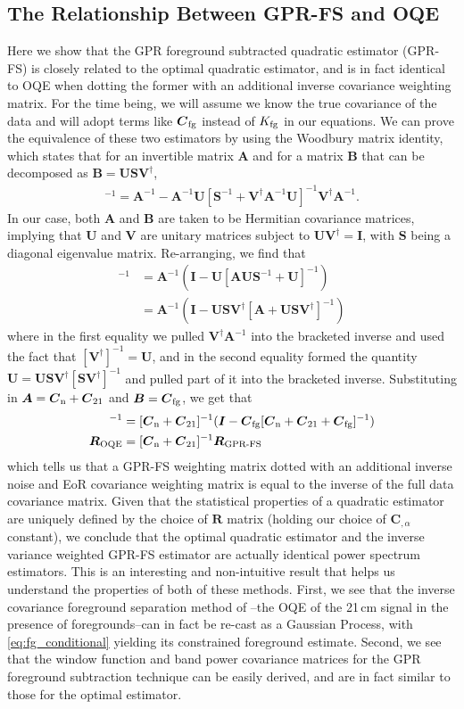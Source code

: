 \documentclass[a4paper,fleqn,usenatbib]{mnras}
\def\R{\boldsymbol{R}}
\def\C{\boldsymbol{C}}
\def\V{\boldsymbol{V}}
\def\Cfg{\boldsymbol{C}_{\rm fg}}
\def\Cto{\boldsymbol{C}_{\rm 21}}
\def\Cn{\boldsymbol{C}_{\rm n}}
\def\I{\boldsymbol{I}}
\def\Kfg{K_{\rm fg}}
\def\A{\boldsymbol{A}}
\def\B{\boldsymbol{B}}
\def\U{\boldsymbol{U}}
\def\S{\boldsymbol{S}}
\def\V{\boldsymbol{V}}
\begin{document}
\subsection{The Relationship Between GPR-FS and OQE}
\label{sec:gpr_oqe}

Here we show that the GPR foreground subtracted quadratic estimator (GPR-FS) is closely related to the optimal quadratic estimator, and is in fact identical to OQE when dotting the former with an additional inverse covariance weighting matrix.
For the time being, we will assume we know the true covariance of the data and will adopt terms like $\Cfg$ instead of $\Kfg$ in our equations.
We can prove the equivalence of these two estimators by using the Woodbury matrix identity, which states that for an invertible matrix $\A$ and for a matrix $\B$ that can be decomposed as $\B = \U\S\V^\dagger$,
\begin{align}
[\A + \U\S\V^\dagger]^{-1} = \A^{-1} - \A^{-1}\U[\S^{-1} + \V^\dagger\A^{-1}\U]^{-1}\V^\dagger\A^{-1}.
\end{align}
In our case, both $\A$ and $\B$ are taken to be Hermitian covariance matrices, implying that $\U$ and $\V$ are unitary matrices subject to $\U\V^\dagger = \I$, with $\S$ being a diagonal eigenvalue matrix.
Re-arranging, we find that
\begin{align}
[\A + \U\S\V^\dagger]^{-1} &= \A^{-1}(\I - \U[\A\U\S^{-1} + \U]^{-1}) \nonumber \\ 
&=\A^{-1}(\I - \U\S\V^\dagger[\A + \U\S\V^\dagger]^{-1})
\end{align}
where in the first equality we pulled $\V^\dagger\A^{-1}$ into the bracketed inverse and used the fact that $[\V^\dagger]^{-1} = \U$, and in the second equality formed the quantity $\U = \U\S\V^\dagger[\S\V^\dagger]^{-1}$ and pulled part of it into the bracketed inverse.
Substituting in $\A = \Cn + \Cto$ and $\B = \Cfg$, we get that
\begin{align}
[\Cn + \Cto + \Cfg]^{-1} &= [\Cn + \Cto]^{-1}(\I - \Cfg[\Cn + \Cto +  \Cfg]^{-1}) \nonumber \\
\R_{\rm OQE} &= [\Cn + \Cto]^{-1}\R_{\operatorname{GPR-FS}}
\end{align}
which tells us that a GPR-FS weighting matrix dotted with an additional inverse noise and EoR covariance weighting matrix is equal to the inverse of the full data covariance matrix.
Given that the statistical properties of a quadratic estimator are uniquely defined by the choice of $\R$ matrix (holding our choice of $\C_{,\alpha}$ constant), we conclude that the optimal quadratic estimator and the inverse variance weighted GPR-FS estimator are actually identical power spectrum estimators.
This is an interesting and non-intuitive result that helps us understand the properties of both of these methods.
First, we see that the inverse covariance foreground separation method of \citet{Liu2011}--the OQE of the 21\,cm signal in the presence of foregrounds--can in fact be re-cast as a Gaussian Process, with \autoref{eq:fg_conditional} yielding its constrained foreground estimate.
Second, we see that the window function and band power covariance matrices for the GPR foreground subtraction technique can be easily derived, and are in fact similar to those for the optimal estimator.
\end{document}
